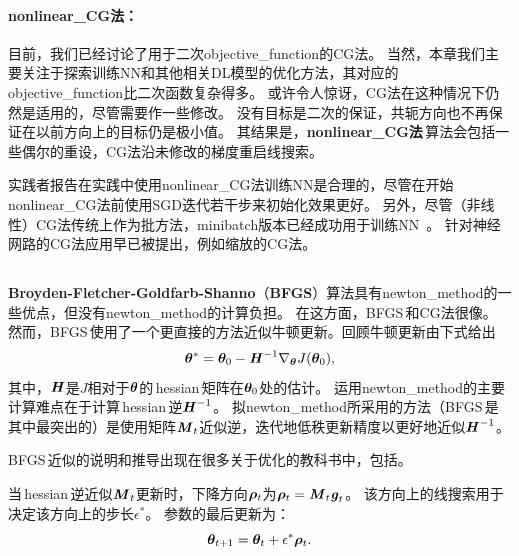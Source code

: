 \paragraph{\gls{nonlinear_CG}法：}
目前，我们已经讨论了用于二次\gls{objective_function}的\gls{CG}法。
当然，本章我们主要关注于探索训练\gls{NN}和其他相关\gls{DL}模型的优化方法，其对应的\gls{objective_function}比二次函数复杂得多。
或许令人惊讶，\gls{CG}法在这种情况下仍然是适用的，尽管需要作一些修改。
没有目标是二次的保证，共轭方向也不再保证在以前方向上的目标仍是极小值。
其结果是，\textbf{\gls{nonlinear_CG}法}\,算法会包括一些偶尔的重设，\gls{CG}法沿未修改的梯度重启线搜索。


实践者报告在实践中使用\gls{nonlinear_CG}法训练\gls{NN}是合理的，尽管在开始\gls{nonlinear_CG}法前使用\gls{SGD}迭代若干步来初始化效果更好。
另外，尽管（非线性）\gls{CG}法传统上作为批方法，\gls{minibatch}版本已经成功用于训练\gls{NN}~\citep{Le-ICML2011}。
针对神经网路的\gls{CG}法应用早已被提出，例如缩放的\gls{CG}法\citep{Moller}。

\subsection{}
\label{sec:bfgs}
\textbf{Broyden-Fletcher-Goldfarb-Shanno}（\textbf{\gls{BFGS}}）算法具有\gls{newton_method}的一些优点，但没有\gls{newton_method}的计算负担。
在这方面，\gls{BFGS}\,和\gls{CG}法很像。
然而，\gls{BFGS}\,使用了一个更直接的方法近似牛顿更新。回顾牛顿更新由下式给出
\begin{equation}
    \boldsymbol{\theta}^* = \boldsymbol{\theta}_0 - \boldsymbol{\mathit{H}}^{-1} \nabla_{\boldsymbol{\theta}} J(\boldsymbol{\theta}_0),
\end{equation}
其中，$\boldsymbol{\mathit{H}}$是$J$相对于$\boldsymbol{\theta}$的\,\gls{hessian}\,矩阵在$\boldsymbol{\theta}_0$处的估计。
运用\gls{newton_method}的主要计算难点在于计算\,\gls{hessian}\,逆$\boldsymbol{\mathit{H}}^{-1}$。
拟\gls{newton_method}所采用的方法（\gls{BFGS}\,是其中最突出的）是使用矩阵$\boldsymbol{\mathit{M}}_t$近似逆，迭代地低秩更新精度以更好地近似$\boldsymbol{\mathit{H}}^{-1}$。


\gls{BFGS}\,近似的说明和推导出现在很多关于优化的教科书中，包括\cite{Lue84}。

当\,\gls{hessian}\,逆近似$\boldsymbol{\mathit{M}}_t$更新时，下降方向$\boldsymbol{\rho}_t$为$\boldsymbol{\rho}_t = \boldsymbol{\mathit{M}}_t \boldsymbol{\mathit{g}}_t$。
该方向上的线搜索用于决定该方向上的步长$\epsilon^*$。
参数的最后更新为：
\begin{equation}
    \boldsymbol{\theta}_{t+1} = \boldsymbol{\theta}_t + \epsilon^* \boldsymbol{\rho}_t.
\end{equation}

